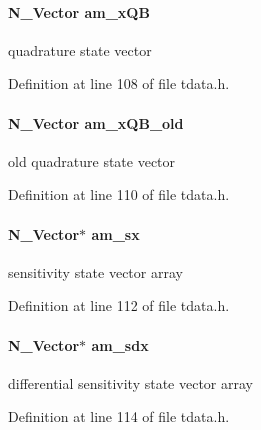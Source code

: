 \paragraph[{am\+\_\+x\+Q\+B}]{\setlength{\rightskip}{0pt plus 5cm}N\+\_\+\+Vector am\+\_\+x\+Q\+B}\label{struct_temp_data_ac4099b4f6bf1f15d7d07b88993515da7}
quadrature state vector 

Definition at line 108 of file tdata.\+h.

\hypertarget{struct_temp_data_a132a821ce32c806eb4691a94da216e29}{}
\paragraph[{am\+\_\+x\+Q\+B\+\_\+old}]{\setlength{\rightskip}{0pt plus 5cm}N\+\_\+\+Vector am\+\_\+x\+Q\+B\+\_\+old}\label{struct_temp_data_a132a821ce32c806eb4691a94da216e29}
old quadrature state vector 

Definition at line 110 of file tdata.\+h.

\hypertarget{struct_temp_data_a5253085927038bdeb7c327aa14470722}{}
\paragraph[{am\+\_\+sx}]{\setlength{\rightskip}{0pt plus 5cm}N\+\_\+\+Vector$\ast$ am\+\_\+sx}\label{struct_temp_data_a5253085927038bdeb7c327aa14470722}
sensitivity state vector array 

Definition at line 112 of file tdata.\+h.

\hypertarget{struct_temp_data_a2457438c1ae3ea571031bc3c2e440da2}{}
\paragraph[{am\+\_\+sdx}]{\setlength{\rightskip}{0pt plus 5cm}N\+\_\+\+Vector$\ast$ am\+\_\+sdx}\label{struct_temp_data_a2457438c1ae3ea571031bc3c2e440da2}
differential sensitivity state vector array 

Definition at line 114 of file tdata.\+h.

\hypertarget{struct_temp_data_ad918917fdce710fbd6fe9774e35bfcfb}{}
